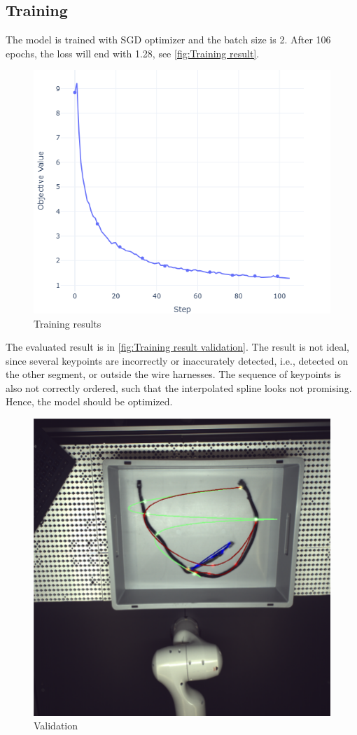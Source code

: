 \subsection{Training} 
The model is trained with SGD optimizer and the batch size is 2. After 106 epochs, the loss will end with 1.28, see \autoref{fig:Training result}.\\
\begin{figure}
	\centering
	\includegraphics[width=0.6\linewidth]{example_images/noAttn_keypoints_100}
	\caption{Training results}
	\label{fig:Training result}
\end{figure}
The evaluated result is in \autoref{fig:Training result validation}. The result is not ideal, since several keypoints are incorrectly or
inaccurately detected, i.e., detected on the other segment, or outside the wire harnesses. The sequence of keypoints is also not correctly 
ordered, such that the interpolated spline looks not promising. Hence, the model should be optimized.
\begin{figure}
	\centering
	\includegraphics[width=0.6\linewidth]{example_images/noAttn_keypoints_100_eval}
	\caption{Validation}
	\label{fig:Training result validation}
\end{figure}
